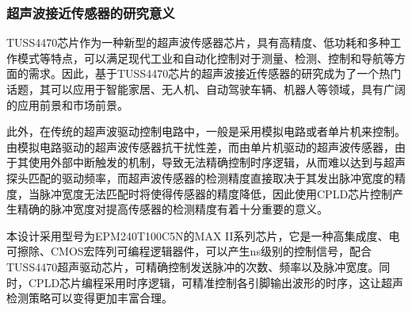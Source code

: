%	
%		
%	
%	
%	
%	
%	
%	
%    
    \subsubsection{超声波接近传感器的研究意义}
    TUSS4470芯片作为一种新型的超声波传感器芯片，具有高精度、低功耗和多种工作模式等特点，可以满足现代工业和自动化控制对于测量、检测、控制和导航等方面的需求。因此，基于TUSS4470芯片的超声波接近传感器的研究成为了一个热门话题，其可以应用于智能家居、无人机、自动驾驶车辆、机器人等领域，具有广阔的应用前景和市场前景。\par
    此外，在传统的超声波驱动控制电路中，一般是采用模拟电路或者单片机来控制。由模拟电路驱动的超声波传感器抗干扰性差，而由单片机驱动的超声波传感器，由于其使用外部中断触发的机制，导致无法精确控制时序逻辑，从而难以达到与超声探头匹配的驱动频率，而超声波传感器的检测精度直接取决于其发出脉冲宽度的精度，当脉冲宽度无法匹配时将使得传感器的精度降低，因此使用CPLD芯片控制产生精确的脉冲宽度对提高传感器的检测精度有着十分重要的意义。\par
    本设计采用型号为EPM240T100C5N的MAX II系列芯片，它是一种高集成度、电可擦除、CMOS宏阵列可编程逻辑器件，可以产生ns级别的控制信号，配合TUSS4470超声驱动芯片，可精确控制发送脉冲的次数、频率以及脉冲宽度。同时，CPLD芯片编程采用时序逻辑，可精准控制各引脚输出波形的时序，这让超声检测策略可以变得更加丰富合理。

